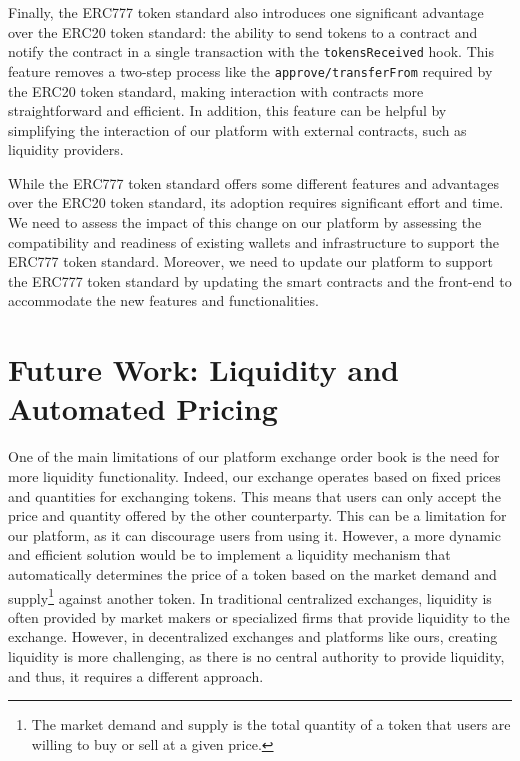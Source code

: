 Finally, the ERC777 token standard also introduces one significant advantage over the ERC20 token standard: the ability to
send tokens to a contract and notify the contract in a single transaction with the \texttt{tokensReceived} hook. This
feature removes a two-step process like the \texttt{approve/transferFrom} required by the ERC20 token standard, making
interaction with contracts more straightforward and efficient. In addition, this feature can be helpful by simplifying the interaction
of our platform with external contracts, such as liquidity providers.


While the ERC777 token standard offers some different features and advantages over the ERC20 token standard, its
adoption requires significant effort and time. We need to assess the impact of this change on our platform by assessing
the compatibility and readiness of existing wallets and infrastructure to support the ERC777 token standard. Moreover,
we need to update our platform to support the ERC777 token standard by updating the smart contracts and the front-end
to accommodate the new features and functionalities.

\section{Future Work: Liquidity and Automated Pricing}


One of the main limitations of our platform exchange order book is the need for more liquidity functionality. Indeed, our
exchange operates based on fixed prices and quantities for exchanging tokens. This means that users can only accept the
price and quantity offered by the other counterparty. This can be a limitation for our platform, as it can discourage
users from using it. However, a more dynamic and efficient solution would be to implement a liquidity
mechanism that automatically determines the price of a token based on the market demand and supply\footnote{The market
demand and supply is the total quantity of a token that users are willing to buy or sell at a given price.} against another
token. In traditional centralized exchanges, liquidity is often provided by market makers or specialized firms that
provide liquidity to the exchange. However, in decentralized exchanges and platforms like ours, creating liquidity is
more challenging, as there is no central authority to provide liquidity, and thus, it requires a different approach.

